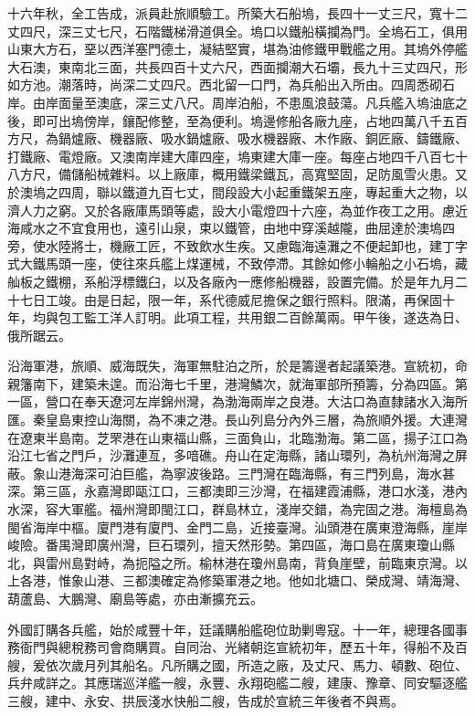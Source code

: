 \begin{pinyinscope}
十六年秋，全工告成，派員赴旅順驗工。所築大石船塢，長四十一丈三尺，寬十二丈四尺，深三丈七尺，石階鐵梯滑道俱全。塢口以鐵船橫攔為門。全塢石工，俱用山東大方石，堊以西洋塞門德土，凝結堅實，堪為油修鐵甲戰艦之用。其塢外停艦大石澳，東南北三面，共長四百十丈六尺，西面攔潮大石壩，長九十三丈四尺，形如方池。潮落時，尚深二丈四尺。西北留一口門，為兵船出入所由。四周悉砌石岸。由岸面量至澳底，深三丈八尺。周岸泊船，不患風浪鼓蕩。凡兵艦入塢油底之後，即可出塢傍岸，鑲配修整，至為便利。塢邊修船各廠九座，占地四萬八千五百方尺，為鍋爐廠、機器廠、吸水鍋爐廠、吸水機器廠、木作廠、銅匠廠、鑄鐵廠、打鐵廠、電燈廠。又澳南岸建大庫四座，塢東建大庫一座。每座占地四千八百七十八方尺，備儲船械雜料。以上廠庫，概用鐵梁鐵瓦，高寬堅固，足防風雪火患。又於澳塢之四周，聯以鐵道九百七丈，間段設大小起重鐵架五座，專起重大之物，以濟人力之窮。又於各廠庫馬頭等處，設大小電燈四十六座，為並作夜工之用。慮近海咸水之不宜食用也，遠引山泉，束以鐵管，由地中穿溪越隴，曲屈達於澳塢四旁，使水陸將士，機廠工匠，不致飲水生疾。又慮臨海遠灘之不便起卸也，建丁字式大鐵馬頭一座，使往來兵艦上煤運械，不致停滯。其餘如修小輪船之小石塢，藏舢板之鐵棚，系船浮標鐵臼，以及各廠內一應修船機器，設置完備。於是年九月二十七日工竣。由是日起，限一年，系代德威尼擔保之銀行照料。限滿，再保固十年，均與包工監工洋人訂明。此項工程，共用銀二百餘萬兩。甲午後，遂迭為日、俄所踞云。

沿海軍港，旅順、威海既失，海軍無駐泊之所，於是籌邊者起議築港。宣統初，命親籓南下，建築未遑。而沿海七千里，港灣鱗次，就海軍部所預籌，分為四區。第一區，營口在奉天遼河左岸錦州灣，為渤海兩岸之良港。大沽口為直隸諸水入海所匯。秦皇島東控山海關，為不凍之港。長山列島分內外三層，為旅順外援。大連灣在遼東半島南。芝罘港在山東福山縣，三面負山，北臨渤海。第二區，揚子江口為沿江七省之門戶，沙灘連亙，多喑礁。舟山在定海縣，諸山環列，為杭州海灣之屏蔽。象山港海深可泊巨艦，為寧波後路。三門灣在臨海縣，有三門列島，海水甚深。第三區，永嘉灣即甌江口，三都澳即三沙灣，在福建霞浦縣，港口水淺，港內水深，容大軍艦。福州灣即閩江口，群島林立，淺岸交錯，為完固之港。海檀島為閩省海岸中樞。廈門港有廈門、金門二島，近接臺灣。汕頭港在廣東澄海縣，崖岸峻險。番禺灣即廣州灣，巨石環列，擅天然形勢。第四區，海口島在廣東瓊山縣北，與雷州島對峙，為扼隘之所。榆林港在瓊州島南，背負崖壁，前臨東京灣。以上各港，惟象山港、三都澳確定為修築軍港之地。他如北塘口、榮成灣、靖海灣、葫蘆島、大鵬灣、廟島等處，亦由漸擴充云。

外國訂購各兵艦，始於咸豐十年，廷議購船艦砲位助剿粵寇。十一年，總理各國事務衙門與總稅務司會商購買。自同治、光緒朝迄宣統初年，歷五十年，得船不及百艘，爰依次歲月列其船名。凡所購之國，所造之廠，及丈尺、馬力、頓數、砲位、兵弁咸詳之。其應瑞巡洋艦一艘，永豐、永翔砲艦二艘，建康、豫章、同安驅逐艦三艘，建中、永安、拱辰淺水快船二艘，告成於宣統三年後者不與焉。


\end{pinyinscope}
